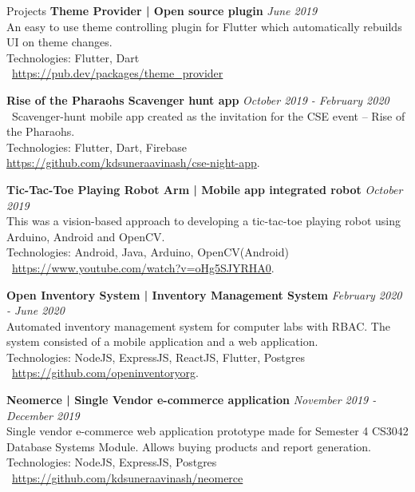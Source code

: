 \documentclass{cv}
\begin{document}
\begin{rSection}{Projects}
    {\bf Theme Provider | Open source plugin}                        \hfill {\em June 2019}
    \\An easy to use theme controlling plugin for Flutter which automatically rebuilds UI on theme changes.\\
    Technologies: Flutter, Dart\\
    \faPlug\  \url{https://pub.dev/packages/theme\_provider} \par

    {\bf Rise of the Pharaohs Scavenger hunt app}                 \hfill {\em October 2019 - February 2020}
    \\ \faGithub*\ Scavenger-hunt mobile app created as the invitation for the CSE event – Rise of the Pharaohs.\\
    Technologies: Flutter, Dart, Firebase\\
    \url{https://github.com/kdsuneraavinash/cse-night-app}. \par

    {\bf Tic-Tac-Toe Playing Robot Arm | Mobile app integrated robot}     \hfill {\em October 2019}
    \\This was a vision-based approach to developing a tic-tac-toe playing robot using Arduino, Android and OpenCV.\\
    Technologies: Android, Java, Arduino, OpenCV(Android)\\
    \faYoutube\ \url{https://www.youtube.com/watch?v=oHg5SJYRHA0}. \par

    {\bf Open Inventory System | Inventory Management System}     \hfill {\em February 2020 - June 2020}
    \\Automated inventory management system for computer labs with RBAC. The system consisted of a mobile application and a web application.\\
    Technologies: NodeJS, ExpressJS, ReactJS, Flutter, Postgres\\
    \faGithub\ \url{https://github.com/openinventoryorg}.\par

    {\bf Neomerce | Single Vendor e-commerce application}         \hfill {\em November 2019 - December 2019}
    \\Single vendor e-commerce web application prototype made for Semester 4 CS3042 Database Systems Module.
    Allows buying products and report generation.\\
    Technologies: NodeJS, ExpressJS, Postgres \\
    \faGithub*\ \url{https://github.com/kdsuneraavinash/neomerce} \par


\end{rSection}
\end{document}
